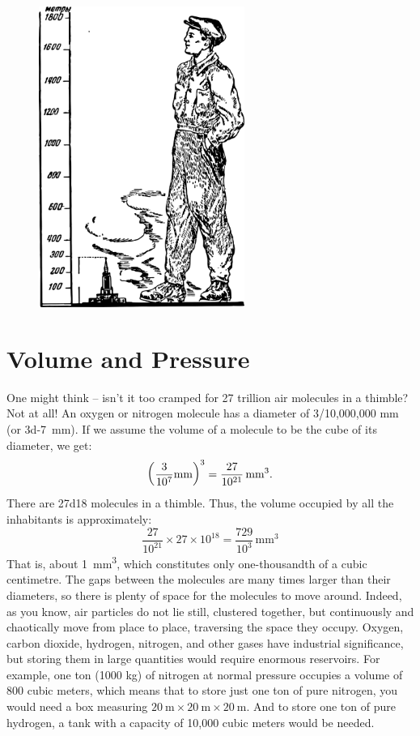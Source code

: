 \begin{figure}[h!]
\centering
\includegraphics[width=0.6\textwidth]{figures/ch-11/fig-161.pdf}
\end{figure}


\section{Volume and Pressure}
\label{sec-11.2}

One might think -- isn’t it too cramped for 27 trillion air molecules in a thimble? Not at all! An oxygen or nitrogen molecule has a diameter of 3/10,000,000 mm (or \SI{3d-7}{\milli\meter}). If we assume the volume of a molecule to be the cube of its diameter, we get:
\begin{equation*}%
\left( \frac{3}{10^{7}} \si{\milli\meter} \right)^3 = \frac{27}{\num{d21}} \,\si{\milli\meter\cubed}.
\end{equation*}
There are \num{27d18} molecules in a thimble. Thus, the volume occupied by all the inhabitants is approximately:
\begin{equation*}%
\frac{27}{10^{21}} \times 27 \times 10^{18} = \frac{729}{10^3} \,\si{\milli\meter\cubed}
\end{equation*}
That is, about \SI{1}{\milli\meter\cubed}, which constitutes only one-thousandth of a cubic centimetre. The gaps between the molecules are many times larger than their diameters, so there is plenty of space for the molecules to move around. Indeed, as you know, air particles do not lie still, clustered together, but continuously and chaotically move from place to place, traversing the space they occupy. Oxygen, carbon dioxide, hydrogen, nitrogen, and other gases have industrial significance, but storing them in large quantities would require enormous reservoirs. For example, one ton (1000 kg) of nitrogen at normal pressure occupies a volume of 800 cubic meters, which means that to store just one ton of pure nitrogen, you would need a box measuring $\SI{20}{\meter} \times \SI{20}{\meter} \times \SI{20}{\meter}$. And to store one ton of pure hydrogen, a tank with a capacity of 10,000 cubic meters would be needed.

